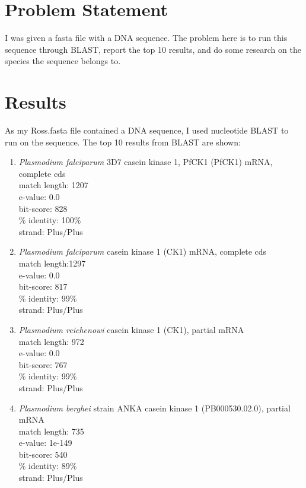 \documentclass{acm_proc_article-sp}
\begin{document}
\section{Problem Statement}
I was given a fasta file with a DNA sequence.  The problem here is to run this sequence through BLAST, report the top 10 results, and do some research on the species the sequence belongs to.


\section{Results}
As my Ross.fasta file contained a DNA sequence, I used nucleotide BLAST to run on the sequence. The top 10 results from BLAST are shown:

\begin{enumerate}
 \item \textit{Plasmodium falciparum} 3D7 casein kinase 1, PfCK1 (PfCK1) mRNA, complete cds \\
 match length: 1207 \\
 e-value: 0.0 \\
 bit-score: 828 \\
 \% identity: 100\% \\
 strand: Plus/Plus \\
 
 \item \textit{Plasmodium falciparum} casein kinase 1 (CK1) mRNA, complete cds \\
  match length:1297  \\
 e-value: 0.0 \\
 bit-score: 817 \\
 \% identity: 99\%\\
 strand: Plus/Plus \\
 
 \item \textit{Plasmodium reichenowi} casein kinase 1 (CK1), partial mRNA \\
  match length: 972 \\
 e-value: 0.0 \\
 bit-score: 767 \\
 \% identity: 99\% \\
 strand: Plus/Plus \\
 
 \item \textit{Plasmodium berghei} strain ANKA casein kinase 1 (PB000530.02.0), partial mRNA \\
  match length: 735 \\
 e-value: 1e-149 \\
 bit-score: 540 \\
 \% identity: 89\% \\
 strand: Plus/Plus \\
 

\end{enumerate}
\end{document}
